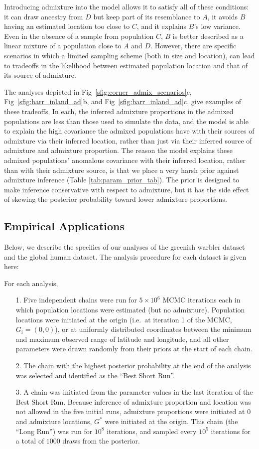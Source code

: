 \documentclass[10pt,letterpaper]{article}
\newcommand{\admixsource}[1]{{$G^{*}$}}
\begin{document}
Introducing admixture into the model allows it to satisfy all of these conditions: it can draw ancestry from $D$ but keep part of its resemblance to $A$, it avoids $B$ having an estimated location too close to $C$, and it explains $B$'s low variance.  Even in the absence of a sample from population $C$, $B$ is better described as a linear mixture of a population close to $A$ and $D$.  However, there are specific scenarios in which a limited sampling scheme (both in size and location), can lead to tradeoffs in the likelihood between estimated population location and that of its source of admixture.

The analyses depicted in Fig\ \ref{sfig:corner_admix_scenarios}c, 
Fig\ \ref{sfig:barr_inland_ad}b, and
Fig\ \ref{sfig:barr_inland_ad}c, 
give examples of these tradeoffs.
In each, the inferred admixture proportions in the admixed populations are less than those used to simulate the data,
and the model is able to explain the high covariance the admixed populations have with their sources of admixture via their inferred location,
rather than just via their inferred source of admixture and admixture proportion.  
The reason the model explains these admixed populations' anomalous covariance with their inferred location,
rather than with their admixture source,
is that we place a very harsh prior against admixture inference (Table \ref{tab:param_prior_tab}).
The prior is designed to make inference conservative with respect to admixture,
but it has the side effect of skewing the posterior probability toward lower admixture proportions.

\subsection*{Empirical Applications}
Below, we describe the specifics of our analyses of the greenish warbler dataset and the global human dataset.  The analysis procedure for each dataset is given here:

For each analysis,
\begin{itemize}
\item[1.] Five independent chains were run for $5\times 10^6$ MCMC iterations each in which population locations were estimated (but no admixture).  Population locations were initiated at the origin (i.e.\, at iteration 1 of the MCMC, $G_i = (0,0)$), or at uniformly distributed coordinates between the minimum and maximum observed range of latitude and longitude, and all other parameters were drawn randomly from their priors at the start of each chain.  
\item[2.]The chain with the highest posterior probability at the end of the analysis was selected and identified as the ``Best Short Run''.
\item[3.] A chain was initiated from the parameter values in the last iteration of the Best Short Run.  Because inference of admixture proportion and location was not allowed in the five initial runs, admixture proportions were initiated at 0 and admixture locations, \admixsource{G} were initiated at the origin.  This  chain (the ``Long Run'') was run for $10^8$ iterations, and sampled every $10^5$ iterations for a total of $1000$ draws from the posterior.
\end{itemize}
\end{document}
